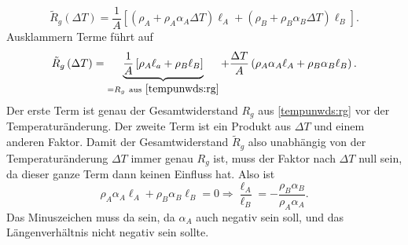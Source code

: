 \begin{Answer}[ref=tempind]
\begin{equation*}
	\tilde{R}_g\left(\Delta T\right) = \frac{1}{A}\left[\left(\rho_A + \rho_A \alpha_A \Delta T\right)\ell_A + \left(\rho_B + \rho_B \alpha_B \Delta T\right) \ell_B \right].
\end{equation*}
Ausklammern Terme führt auf
\begin{equation}\label{tempunwds:rgtemp}
	\tilde{R}_g\left(\Delta T\right) =\underbrace{\frac{1}{A}\left[ \rho_A \ell_a + \rho_B \ell_B\right]}_{= R_g~  \mathrm{aus}~ \eqref{tempunwds:rg}} +\frac{\Delta T}{A} \left(\rho_A \alpha_A \ell_A + \rho_B \alpha_B \ell_B \right).
\end{equation}
Der erste Term ist genau der Gesamtwiderstand $R_g$ aus \eqref{tempunwds:rg} vor der Temperaturänderung. Der zweite Term ist ein Produkt aus $\Delta T$ und einem anderen Faktor. Damit der Gesamtwiderstand $\tilde{R}_g$ also unabhängig von der Temperaturänderung $\Delta T$ immer genau $R_g$ ist, muss der Faktor nach $\Delta T$ null sein, da dieser ganze Term dann keinen Einfluss hat. Also ist
\begin{equation}
\boxed{
	\rho_A \alpha_A\ell_A + \rho_B \alpha_B\ell_B = 0 \Rightarrow \frac{\ell_A}{\ell_B} = -\frac{\rho_B\alpha_B}{\rho_A\alpha_A}}.
\end{equation}
Das Minuszeichen muss da sein, da $\alpha_A$ auch negativ sein soll, und das Längenverhältnis nicht negativ sein sollte.
\end{Answer}